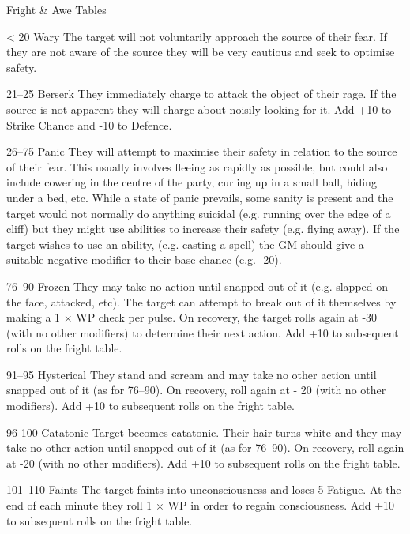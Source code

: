 \begin{Tables}{Fright \& Awe Tables}
\begin{multicols}{3}
\begin{Description}
\item[< 20] Wary The target will not voluntarily approach the source
  of their fear. If they are not aware of the source they will be very
  cautious and seek to optimise safety.

\item[21–25] Berserk They immediately charge to attack the object of
  their rage. If the source is not apparent they will charge about
  noisily looking for it. Add +10 to Strike Chance and -10 to Defence.

\item[26–75] Panic They will attempt to maximise their safety in
  relation to the source of their fear. This usually involves fleeing
  as rapidly as possible, but could also include cowering in the
  centre of the party, curling up in a small ball, hiding under a bed,
  etc. While a state of panic prevails, some sanity is present and the
  target would not normally do anything suicidal (e.g. running over
  the edge of a cliff) but they might use abilities to increase their
  safety (e.g.  flying away). If the target wishes to use an ability,
  (e.g. casting a spell) the GM should give a suitable negative
  modifier to their base chance (e.g. -20).


\item[76–90] Frozen They may take no action until snapped out of it
  (e.g.  slapped on the face, attacked, etc). The target can attempt
  to break out of it themselves by making a 1 × WP check per pulse. On
  recovery, the target rolls again at -30 (with no other modifiers) to
  determine their next action. Add +10 to subsequent rolls on the
  fright table.

\item[91–95] Hysterical They stand and scream and may take no other
  action until snapped out of it (as for 76–90). On recovery, roll
  again at - 20 (with no other modifiers). Add +10 to subsequent rolls
  on the fright table.

\item[96-100] Catatonic Target becomes catatonic. Their hair turns
  white and they may take no other action until snapped out of it (as
  for 76–90). On recovery, roll again at -20 (with no other
  modifiers). Add +10 to subsequent rolls on the fright table.

\item[101–110] Faints The target faints into unconsciousness and loses
  5 Fatigue.  At the end of each minute they roll 1 × WP in order to
  regain consciousness. Add +10 to subsequent rolls on the fright
  table.



\end{Description}
\end{multicols}
\end{Tables}
